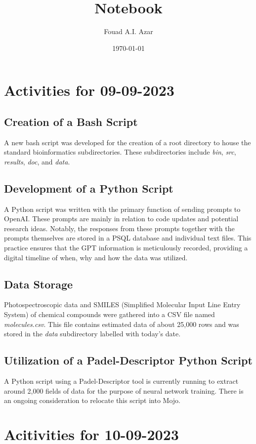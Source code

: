 \documentclass{article}
\title{Notebook}
\author{Fouad A.I. Azar}
\date{\today}
\begin{document}
\maketitle

\section{Activities for 09-09-2023}
\subsection{Creation of a Bash Script}
A new bash script was developed for the creation of a root directory to house the standard bioinformatics subdirectories. These subdirectories include \textit{bin}, \textit{src}, \textit{results}, \textit{doc}, and \textit{data}.

\subsection{Development of a Python Script}
A Python script was written with the primary function of sending prompts to OpenAI. These prompts are mainly in relation to code updates and potential research ideas. Notably, the responses from these prompts together with the prompts themselves are stored in a PSQL database and individual text files. This practice ensures that the GPT information is meticulously recorded, providing a digital timeline of when, why and how the data was utilized.

\subsection{Data Storage}
Photospectroscopic data and SMILES (Simplified Molecular Input Line Entry System) of chemical compounds were gathered into a CSV file named \textit{molecules.csv}. This file contains estimated data of about 25,000 rows and was stored in the \textit{data} subdirectory labelled with today's date.

\subsection{Utilization of a Padel-Descriptor Python Script}
A Python script using a Padel-Descriptor tool is currently running to extract around 2,000 fields of data for the purpose of neural network training. There is an ongoing consideration to relocate this script into Mojo.

\section{Acitivities for 10-09-2023}
\end{document}
